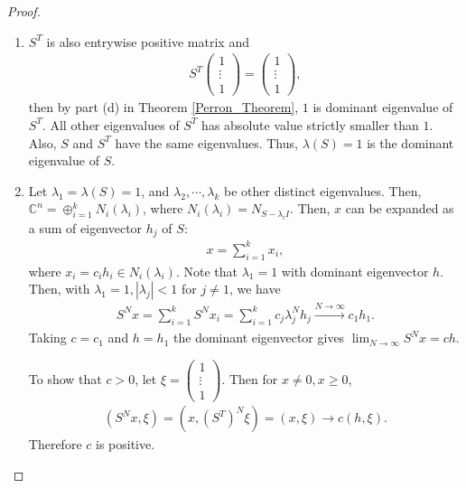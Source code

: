 \documentclass[10pt]{book}
\theoremstyle{definition}
\numberwithin{equation}{chapter}
\begin{document}
\begin{proof}
~\begin{enumerate}[label=(\alph*)]
    \item $S^T$ is also entrywise positive matrix and 
    \begin{align*}
        S^T \begin{pmatrix} 1 \\ \vdots \\ 1 \end{pmatrix} = \begin{pmatrix} 1 \\ \vdots \\ 1 \end{pmatrix},
    \end{align*}
    then by part (d) in Theorem \ref{Perron_Theorem}, $1$ is dominant eigenvalue of $S^T$. All other eigenvalues of $S^T$ has absolute value strictly smaller than $1$. Also, $S$ and $S^T$ have the same eigenvalues. Thus, $\lambda(S) = 1$ is the dominant eigenvalue of $S$.
    
    \item Let $\lambda_1 = \lambda(S) = 1$, and $\lambda_2, \cdots, \lambda_k$ be other distinct eigenvalues. Then, $\mathbb{C}^n = \oplus^k_{i=1} N_i(\lambda_i)$, where $N_i(\lambda_i) = N_{S - \lambda_i I}$. Then, $x$ can be expanded as a sum of eigenvector $h_j$ of $S$:
    \begin{align*}
        x = \sum^k_{i=1} x_i,
    \end{align*}
    where $x_i = c_i h_i \in N_i(\lambda_i)$. Note that $\lambda_1 = 1$ with dominant eigenvector $h$. Then, with $\lambda_1 = 1, |\lambda_j| < 1$ for $j \neq 1$, we have
    \begin{align*}
        S^N x = \sum^k_{i=1} S^N x_i = \sum^k_{i=1} c_j \lambda_j^N h_j \xrightarrow[]{N\to\infty} c_1 h_1.
    \end{align*}
    Taking $c = c_1$ and $h = h_1$ the dominant eigenvector gives $\lim_{N \to \infty} S^N x = ch$.
    
    To show that $c > 0$, let $\xi = \begin{pmatrix} 1 \\ \vdots \\ 1 \end{pmatrix}$. Then for $x \neq 0, x \geq 0$, 
    \begin{align*}
        \left(S^Nx, \xi\right) = \left(x, \left(S^T\right)^N \xi\right) = (x, \xi) \to c(h, \xi).
    \end{align*}
    Therefore $c$ is positive. 
\end{enumerate}
\end{proof}
\end{document}

